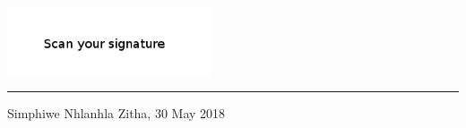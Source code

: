 \includegraphics[height=2cm]{images/signature.png} \newline \hrule
Simphiwe Nhlanhla Zitha, 30 May 2018

